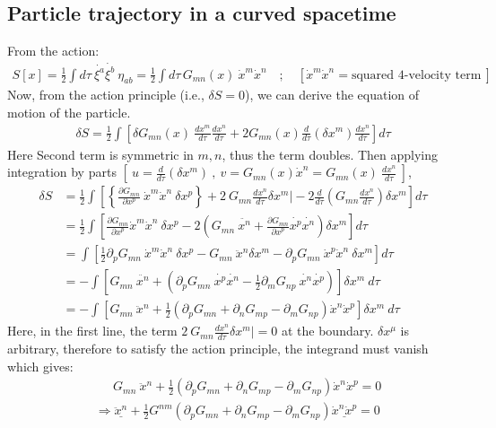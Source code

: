 \documentclass[14pt]{article} %
\begin{document}
\subsection{Particle trajectory in a curved spacetime}
From the action:
\begin{align*}
S[x] = \frac{1}{2} \int d\tau ~\dot{\xi^a}\dot{\xi^b}~ \eta_{ab}
= \frac{1}{2} \int d\tau\, G_{mn}(x) ~\dot{x}^m \dot{x}^n
\quad;\quad [\dot{x}^m \dot{x}^n =\text{squared 4-velocity term} ~]
\end{align*}
\noindent
Now, from the action principle (i.e., $\delta S = 0$), we can derive the equation of motion of the particle.
\begin{align*}
\delta S = \frac{1}{2} \int \left[ \delta G_{mn}(x)~ \frac{dx^m}{d \tau} \frac{dx^n}{d \tau} + 2 G_{mn}(x) \frac{d}{d\tau} (\delta x^m) \frac{dx^n}{d \tau} \right] d\tau
\end{align*}
Here Second term is symmetric in $m,n$, thus the term doubles. Then applying integration by parts $\left[~ u=\frac{d}{d\tau} (\delta x^m)~,~v=G_{mn}(x) \dot{x}^n=G_{mn}(x) ~\frac{dx^n}{d\tau} ~\right]$,
\begin{align*}
\delta S &= \frac{1}{2} \int \left[ \left\{\frac{\partial G_{mn}}{\partial x^p}~\dot{x}^m \dot{x}^n~\delta x^p \right\} + 2~G_{mn} \frac{dx^n}{d\tau} \delta x^m\Bigg| -2 \frac{d}{d\tau}\left(G_{mn}\frac{dx^n}{d\tau}\right)\delta x^m \right] d\tau \\
&= \frac{1}{2} \int \left[ \frac{\partial G_{mn}}{\partial x^p} \dot{x}^m \dot{x}^n~\delta x^p -2 \left(G_{mn}~\ddot{x^n}+\frac{\partial G_{mn}}{\partial x^p} \dot{x^p}\dot{x^n}  \right)\delta x^m \right] d\tau \\
&= \int \left[ \frac{1}{2}\partial_p G_{mn}~\dot{x}^m \dot{x}^n~\delta x^p - G_{mn}~\ddot{x}^n \delta x^m - \partial_p G_{mn}~\dot{x}^p \dot{x}^n~\delta x^m  \right] d\tau \\
&= -\int \left[ G_{mn}~\ddot{x^n} + \left( \partial_p G_{mn}~\dot{x^p}\dot{x^n} - \frac{1}{2}\partial_m G_{np}~\dot{x^n} \dot{x^p} \right) \right] \delta x^m~d\tau  \\
&= - \int \left[ G_{mn}~\ddot{x}^n + \frac{1}{2} \left( \partial_p G_{mn} + \partial_n G_{mp} - \partial_m G_{np} \right) \dot{x}^n \dot{x}^p \right] \delta x^m~d \tau
\end{align*}
Here, in the first line, the term $2~G_{mn} \frac{dx^n}{d\tau} \delta x^m\Bigg|=0$ at the boundary. $\delta x^\mu$ is arbitrary, therefore to satisfy the action principle, the integrand must vanish which gives:
\begin{align*}
&\quad ~~ G_{mn}~\ddot{x}^n + \frac{1}{2} \left( \partial_p G_{mn} + \partial_n G_{mp} - \partial_m G_{np} \right) \dot{x}^n \dot{x}^p = 0 \\
& \Rightarrow \underline{\ddot{x}^n} + \frac{1}{2}G^{nm} \left( \partial_p G_{mn} + \partial_n G_{mp} - \partial_m G_{np} \right) \underline{\dot{x}^n \dot{x}^p}= 0
\end{align*}
\end{document}
